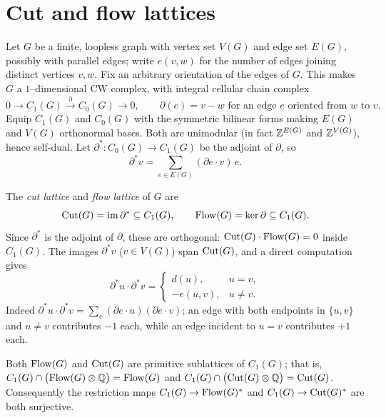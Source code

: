\section{Cut and flow lattices}
\label{sec:cutflow}

Let $G$ be a finite, loopless graph with vertex set $V(G)$ and edge set $E(G)$, possibly
with parallel edges; write $e(v,w)$ for the number of edges joining distinct vertices
$v,w$.  Fix an arbitrary orientation of the edges of $G$.  This makes $G$ a $1$--dimensional
CW complex, with integral cellular chain complex
\[
0\longrightarrow C_1(G)\overset{\partial}{\longrightarrow}C_0(G)\longrightarrow 0,
\qquad \partial(e)=v-w \text{ for an edge $e$ oriented from $w$ to $v$.}
\]
Equip $C_1(G)$ and $C_0(G)$ with the symmetric bilinear forms making $E(G)$ and $V(G)$
orthonormal bases.  Both are unimodular (in fact $\mathbb{Z}^{E(G)}$ and $\mathbb{Z}^{V(G)}$), hence
self-dual.  Let $\partial^\ast:C_0(G)\to C_1(G)$ be the adjoint of $\partial$, so
\[
\partial^\ast v=\sum_{e\in E(G)}(\partial e\cdot v)\,e .
\]

The \emph{cut lattice} and \emph{flow lattice} of $G$ are
\[
\operatorname{Cut}(G)=\operatorname{im}\partial^\ast\subseteq C_1(G),
\qquad
\operatorname{Flow}(G)=\ker\partial\subseteq C_1(G).
\]
Since $\partial^\ast$ is the adjoint of $\partial$, these are orthogonal:
$\operatorname{Cut}(G)\cdot\operatorname{Flow}(G)=0$ inside $C_1(G)$.  The images $\partial^\ast v$ ($v\in V(G)$) span
$\operatorname{Cut}(G)$, and a direct computation gives
\begin{equation}
\label{eq:cob}
\partial^\ast u\cdot\partial^\ast v=
\begin{cases}
d(u), & u=v,\\
-e(u,v), & u\ne v.
\end{cases}
\end{equation}
Indeed $\partial^\ast u\cdot\partial^\ast v=\sum_e(\partial e\cdot u)(\partial e\cdot v)$;
an edge with both endpoints in $\{u,v\}$ and $u\ne v$ contributes $-1$ each, while an edge
incident to $u=v$ contributes $+1$ each.

\begin{lem}[Primitivity]
\label{lem:primitive}
Both $\operatorname{Flow}(G)$ and $\operatorname{Cut}(G)$ are primitive sublattices of $C_1(G)$; that is,
$C_1(G)\cap\bigl(\operatorname{Flow}(G)\otimes\mathbb{Q}\bigr)=\operatorname{Flow}(G)$ and
$C_1(G)\cap\bigl(\operatorname{Cut}(G)\otimes\mathbb{Q}\bigr)=\operatorname{Cut}(G)$.
Consequently the restriction maps $C_1(G)\to\operatorname{Flow}(G)^\ast$ and $C_1(G)\to\operatorname{Cut}(G)^\ast$ are
both surjective.
\end{lem}

